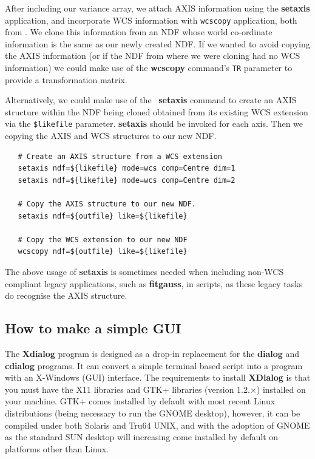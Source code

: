 \documentclass[twoside,11pt]{article}
\newcommand{\htmladdnormallink}[2]{#1}
\newcommand{\xref}[3]{#1}
\newcommand{\xlabel}[1]{}
\begin{document}
{After including our variance array, we attach AXIS information using
the \xref{{\bf setaxis}}{sun95}{SETAXIS} application, and incorporate WCS
information with \xref{{\tt wcscopy}}{sun95}{WCSCOPY} application, both from
\KAPPA.  We clone this information from an NDF whose world co-ordinate
information is the same as our newly created NDF.  If we wanted to
avoid copying the AXIS information (or if the NDF from where we were
cloning had no WCS information) we could make use of the
\xref{{\bf wcscopy}}{sun95}{WCSCOPY} command's {\tt TR} parameter to provide
a transformation matrix.  

\label{sc16_wcs2axis}\xlabel{sc16_wcs2axis}
Alternatively, we could make use of the \KAPPA\ {\bf setaxis} command
to create an AXIS structure within the NDF being cloned obtained from
its existing WCS extension via the
\verb+$likefile+ parameter.  {\bf setaxis} should be invoked for each
axis.  Then we copying the AXIS and WCS structures to our new NDF.

\small\begin{verbatim}
   # Create an AXIS structure from a WCS extension
   setaxis ndf=${likefile} mode=wcs comp=Centre dim=1
   setaxis ndf=${likefile} mode=wcs comp=Centre dim=2
   
   # Copy the AXIS structure to our new NDF.
   setaxis ndf=${outfile} like=${likefile}
   
   # Copy the WCS extension to our new NDF
   wcscopy ndf=${outfile} like=${likefile}
\end{verbatim}\normalsize

The above usage of {\bf setaxis} is sometimes needed when including non-WCS
compliant legacy applications, such as
\xref{{\bf fitgauss}}{sun86}{FITGAUSS}, in scripts, as these legacy tasks do
recognise the AXIS structure.

\subsection{\xlabel{sc16_xdialog}How to make a simple GUI\label{sc16_xdialog}}

The \htmladdnormallink{{\bf Xdialog}}{http://xdialog.dyns.net/} program
is designed as a drop-in replacement for the {\bf dialog} and {\bf
cdialog} programs.  It can convert a simple terminal based script into
a program with an X-Windows (GUI) interface.  The requirements to
install {\bf XDialog} is that you must have the X11 libraries and
\htmladdnormallink{GTK+ libraries}{http://www.gtk.org} (version
1.2.$\times$) installed on your machine.  GTK+ comes installed by
default with most recent Linux distributions (being necessary to run
the {{\footnotesize GNOME}\normalsize} desktop), however, it can be
compiled under both Solaris and Tru64 UNIX, and with the adoption of
{{\footnotesize GNOME}\normalsize} as the standard SUN desktop will
increasing come installed by default on platforms other than Linux.

}
\end{document}
